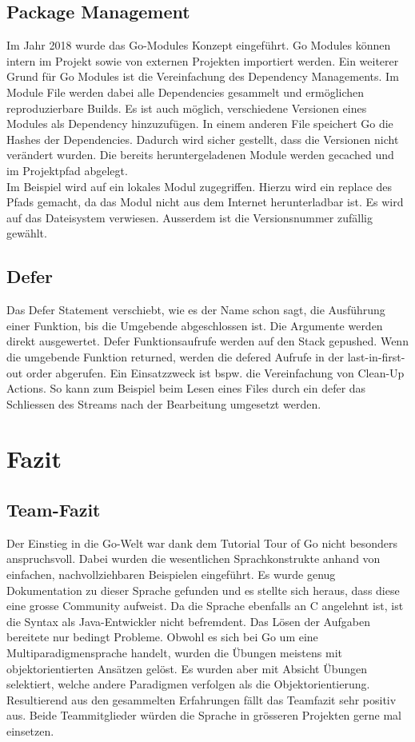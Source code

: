 \documentclass[12pt,titlepage]{article}
\begin{document}
\subsection{Package Management}
Im Jahr 2018 wurde das Go-Modules Konzept eingeführt. Go Modules können intern im Projekt sowie von externen Projekten importiert werden. Ein weiterer Grund für Go Modules ist die Vereinfachung des Dependency Managements. Im Module File werden dabei alle Dependencies gesammelt und ermöglichen reproduzierbare Builds. Es ist auch möglich, verschiedene Versionen eines Modules als Dependency hinzuzufügen. In einem anderen File speichert Go die Hashes der Dependencies. Dadurch wird sicher gestellt, dass die Versionen nicht verändert wurden. Die bereits heruntergeladenen Module werden gecached und im Projektpfad abgelegt. \\
Im Beispiel wird auf ein lokales Modul zugegriffen. Hierzu wird ein replace des Pfads gemacht, da das Modul nicht aus dem Internet herunterladbar ist. Es wird auf das Dateisystem verwiesen. Ausserdem ist die Versionsnummer zufällig gewählt. 

\subsection{Defer}
Das Defer Statement verschiebt, wie es der Name schon sagt, die Ausführung einer Funktion, bis die Umgebende abgeschlossen ist. Die Argumente werden direkt ausgewertet. Defer Funktionsaufrufe werden auf den Stack gepushed. Wenn die umgebende Funktion returned, werden die defered Aufrufe in der last-in-first-out order abgerufen. Ein Einsatzzweck ist bspw. die Vereinfachung von Clean-Up Actions. So kann zum Beispiel beim Lesen eines Files durch ein defer das Schliessen des Streams nach der Bearbeitung umgesetzt werden.

\section{Fazit}
\subsection{Team-Fazit}
Der Einstieg in die Go-Welt war dank dem Tutorial \glqq Tour of Go\grqq{} nicht besonders anspruchsvoll.
Dabei wurden die wesentlichen Sprachkonstrukte anhand von einfachen, nachvollziehbaren Beispielen eingeführt.
Es wurde genug Dokumentation zu dieser Sprache gefunden und es stellte sich heraus, dass diese eine grosse Community aufweist.
Da die Sprache ebenfalls an C angelehnt ist, ist die Syntax als Java-Entwickler nicht befremdent.
Das Lösen der Aufgaben bereitete nur bedingt Probleme.
Obwohl es sich bei Go um eine Multiparadigmensprache handelt, wurden die Übungen meistens mit objektorientierten Ansätzen gelöst.
Es wurden aber mit Absicht Übungen selektiert, welche andere Paradigmen verfolgen als die Objektorientierung. \\
Resultierend aus den gesammelten Erfahrungen fällt das Teamfazit sehr positiv aus.
Beide Teammitglieder würden die Sprache in grösseren Projekten gerne mal einsetzen.
\end{document}
